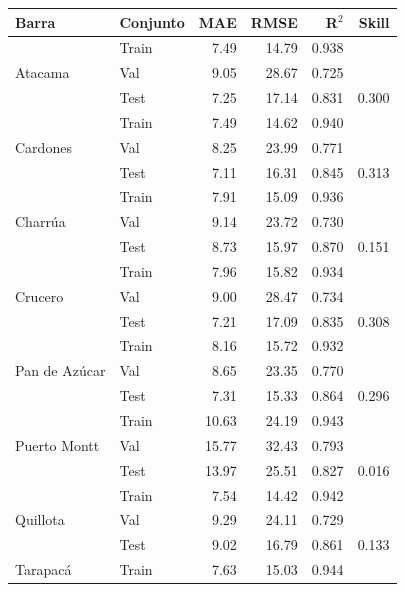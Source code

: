 \begin{table}[htbp]
    \centering
    \small
    \begin{tabular}{llrrrr}
        \toprule
        Barra & Conjunto & MAE & RMSE & R$^2$ & Skill \\
        \midrule
        \multirow{3}{*}{Atacama}
            & Train & 7.49 & 14.79 & 0.938 & \\
            & Val   & 9.05 & 28.67 & 0.725 & \\
            & Test  & 7.25 & 17.14 & 0.831 & 0.300 \\
        \midrule
        \multirow{3}{*}{Cardones}
            & Train & 7.49 & 14.62 & 0.940 & \\
            & Val   & 8.25 & 23.99 & 0.771 & \\
            & Test  & 7.11 & 16.31 & 0.845 & 0.313 \\
        \midrule
        \multirow{3}{*}{Charrúa}
            & Train & 7.91 & 15.09 & 0.936 & \\
            & Val   & 9.14 & 23.72 & 0.730 & \\
            & Test  & 8.73 & 15.97 & 0.870 & 0.151 \\
        \midrule
        \multirow{3}{*}{Crucero}
            & Train & 7.96 & 15.82 & 0.934 & \\
            & Val   & 9.00 & 28.47 & 0.734 & \\
            & Test  & 7.21 & 17.09 & 0.835 & 0.308 \\
        \midrule
        \multirow{3}{*}{Pan de Azúcar}
            & Train & 8.16 & 15.72 & 0.932 & \\
            & Val   & 8.65 & 23.35 & 0.770 & \\
            & Test  & 7.31 & 15.33 & 0.864 & 0.296 \\
        \midrule
        \multirow{3}{*}{Puerto Montt}
            & Train & 10.63 & 24.19 & 0.943 & \\
            & Val   & 15.77 & 32.43 & 0.793 & \\
            & Test  & 13.97 & 25.51 & 0.827 & 0.016 \\
        \midrule
        \multirow{3}{*}{Quillota}
            & Train & 7.54 & 14.42 & 0.942 & \\
            & Val   & 9.29 & 24.11 & 0.729 & \\
            & Test  & 9.02 & 16.79 & 0.861 & 0.133 \\
        \midrule
        \multirow{3}{*}{Tarapacá}
            & Train & 7.63 & 15.03 & 0.944 & \\

\end{tabular}
\end{table}
